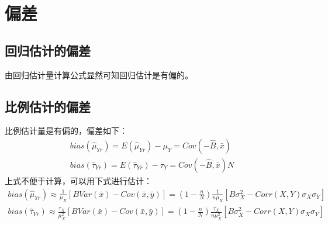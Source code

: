 \section{偏差}
\subsection{回归估计的偏差}
由回归估计量计算公式显然可知回归估计是有偏的。
\subsection{比例估计的偏差}
\begin{theorem}
	比例估计量是有偏的，偏差如下：
	\begin{gather*}
		bias(\hat{\mu}_{Yr})=E(\hat{\mu}_{Yr})-\mu_Y=Cov(-\hat{B},\bar{x}) \\
		bias(\hat{\tau}_{Yr})=E(\hat{\tau}_{Yr})-\tau_Y=Cov(-\hat{B},\bar{x})N
	\end{gather*}
	上式不便于计算，可以用下式进行估计：
	\begin{gather*}
		bias(\hat{\mu}_{Yr})\approx\frac{1}{\mu_X}\left[BVar(\bar{x})-Cov(\bar{x},\bar{y})\right]=\left(1-\frac{n}{N}\right)\frac{1}{n\mu_X}[B\sigma_X^2-Corr(X,Y)\sigma_X\sigma_Y] \\
		bias(\hat{\tau}_{Yr})\approx\frac{\tau_X}{\mu_X^2}\left[BVar(\bar{x})-Cov(\bar{x},\bar{y})\right]=\left(1-\frac{n}{N}\right)\frac{\tau_X}{n\mu_X^2}[B\sigma_X^2-Corr(X,Y)\sigma_X\sigma_Y]
	\end{gather*}
\end{theorem}
